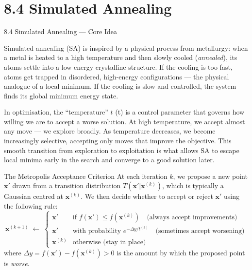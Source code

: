 \documentclass[aspectratio=169,10pt]{beamer}
\begin{document}
\section{8.4 Simulated Annealing}

\begin{frame}[allowframebreaks]{8.4 Simulated Annealing --- Core Idea}

Simulated annealing (SA) is inspired by a physical process from metallurgy: when a metal is heated to a high temperature and then slowly cooled (\emph{annealed}), its atoms settle into a low-energy crystalline structure.
If the cooling is too fast, atoms get trapped in disordered, high-energy configurations --- the physical analogue of a local minimum.
If the cooling is slow and controlled, the system finds its global minimum energy state.

In optimisation, the ``temperature'' $t$ (t) is a control parameter that governs how willing we are to accept a worse solution. At high temperature, we accept almost any move --- we explore broadly. As temperature decreases, we become increasingly selective, accepting only moves that improve the objective. This smooth transition from exploration to exploitation is what allows SA to escape local minima early in the search and converge to a good solution later.

\begin{block}{The Metropolis Acceptance Criterion}
At each iteration $k$, we propose a new point $\mathbf{x}'$ drawn from a transition distribution $T(\mathbf{x}'|\mathbf{x}^{(k)})$, which is typically a Gaussian centred at $\mathbf{x}^{(k)}$.
We then decide whether to accept or reject $\mathbf{x}'$ using the following rule:
\[
  \mathbf{x}^{(k+1)} \;\leftarrow\;
  \begin{cases}
    \mathbf{x}' & \text{if } f(\mathbf{x}') \le f(\mathbf{x}^{(k)}) \quad \text{(always accept improvements)} \\[4pt]
    \mathbf{x}' & \text{with probability } e^{-\Delta y / t^{(k)}} \quad \text{(sometimes accept worsening)} \\[4pt]
    \mathbf{x}^{(k)} & \text{otherwise (stay in place)}
  \end{cases}
\]
where $\Delta y = f(\mathbf{x}') - f(\mathbf{x}^{(k)}) > 0$ is the amount by which the proposed point is \emph{worse}.
\end{block}


\end{frame}
\end{document}
